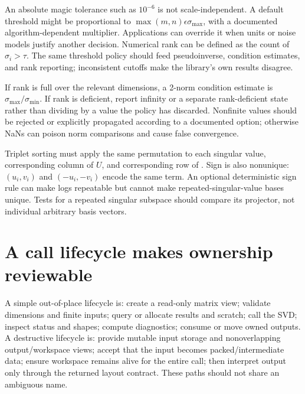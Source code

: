 \hypertarget{02-foundations-ii-ch038-numerical-policies-must-share-one-rank-decision}{}

An absolute magic tolerance such as \(10^{-6}\) is not scale-independent. A default threshold might be proportional to \(\max(m,n)\epsilon\sigma_{\max}\), with a documented algorithm-dependent multiplier. Applications can override it when units or noise models justify another decision. Numerical rank can be defined as the count of \(\sigma_i>\tau\). The same threshold policy should feed pseudoinverse, condition estimates, and rank reporting; inconsistent cutoffs make the library's own results disagree.

If rank is full over the relevant dimensions, a 2-norm condition estimate is \(\sigma_{\max}/\sigma_{\min}\). If rank is deficient, report infinity or a separate rank-deficient state rather than dividing by a value the policy has discarded. Nonfinite values should be rejected or explicitly propagated according to a documented option; otherwise NaNs can poison norm comparisons and cause false convergence.

Triplet sorting must apply the same permutation to each singular value, corresponding column of \(U\), and corresponding row of . Sign is also nonunique: \((u_i,v_i)\) and \((-u_i,-v_i)\) encode the same term. An optional deterministic sign rule can make logs repeatable but cannot make repeated-singular-value bases unique. Tests for a repeated singular subspace should compare its projector, not individual arbitrary basis vectors.

\section{A call lifecycle makes ownership reviewable}\label{02-foundations-ii-ch038-a-call-lifecycle-makes-ownership-reviewable}

\hypertarget{02-foundations-ii-ch038-a-call-lifecycle-makes-ownership-reviewable}{}

A simple out-of-place lifecycle is: create a read-only matrix view; validate dimensions and finite inputs; query or allocate results and scratch; call the SVD; inspect status and shapes; compute diagnostics; consume or move owned outputs. A destructive lifecycle is: provide mutable input storage and nonoverlapping output/workspace views; accept that the input becomes packed/intermediate data; ensure workspace remains alive for the entire call; then interpret output only through the returned layout contract. These paths should not share an ambiguous name.

